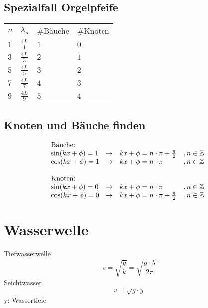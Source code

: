 \subsection{Spezialfall Orgelpfeife}
\begin{tabular}{@{}llll}
\rowcolor{white} $n$ & $\lambda_n$     & \#Bäuche & \#Knoten  \\
\rowcolor{lgray} $1$ & $\frac{4 L}{1}$ & $1$      & $0$       \\
\rowcolor{white} $3$ & $\frac{4 L}{3}$ & $2$      & $1$       \\
\rowcolor{lgray} $5$ & $\frac{4 L}{5}$ & $3$      & $2$       \\
\rowcolor{white} $7$ & $\frac{4 L}{7}$ & $4$      & $3$       \\
\rowcolor{lgray} $9$ & $\frac{4 L}{9}$ & $5$      & $4$       \\
\end{tabular}

\subsection{Knoten und Bäuche finden}
\[ \begin{array}{@{}llll}
\text{Bäuche:} \\
\sin(k x + \phi) = 1 
    & \rightarrow 
    & k x + \phi = n \cdot \pi + \frac{\pi}{2} 
    & , n \in \mathbb{Z} \\
\cos(k x + \phi) = 1 
    & \rightarrow 
    & k x + \phi = n \cdot \pi                 
    & , n \in \mathbb{Z} \\\\
\text{Knoten:} \\
\sin(k x + \phi) = 0 
    & \rightarrow 
    & k x + \phi = n \cdot \pi                 
    & , n \in \mathbb{Z} \\
\cos(k x + \phi) = 0 
    & \rightarrow 
    & k x + \phi = n \cdot \pi + \frac{\pi}{2} 
    & , n \in \mathbb{Z} \\
\end{array} \]

\section{Wasserwelle}
Tiefwasserwelle
\[ \boxed{v = \sqrt{\frac{g}{k}} = \sqrt{\frac{g \cdot \lambda}{2 \pi}}} \]
Seichtwasser
\[ \boxed{v = \sqrt{g \cdot y}} \]
y: Wassertiefe